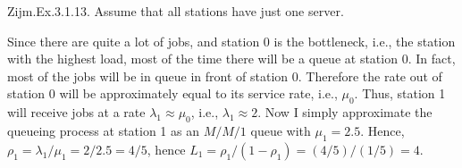 \begin{exercise}
Zijm.Ex.3.1.13. Assume that all stations have just one server.
\begin{solution}
  Since there are quite a lot of jobs, and station 0 is the
  bottleneck, i.e., the station with the highest load, most of the
  time there will be a queue at station 0. In fact, most of the jobs
  will be in queue in front of station 0. Therefore the rate out of
  station 0 will be approximately equal to its service rate, i.e.,
  $\mu_0$. Thus, station 1 will receive jobs at a rate
  $\lambda_1\approx\mu_0$, i.e., $\lambda_1 \approx 2$. Now I simply
  approximate the queueing process at station 1 as an $M/M/1$ queue
  with $\mu_1=2.5$. Hence, $\rho_1 = \lambda_1/\mu_1=2/2.5 = 4/5$,
  hence $L_1 = \rho_1/(1-\rho_1) = (4/5)/(1/5) = 4$.
\end{solution}
\end{exercise}



